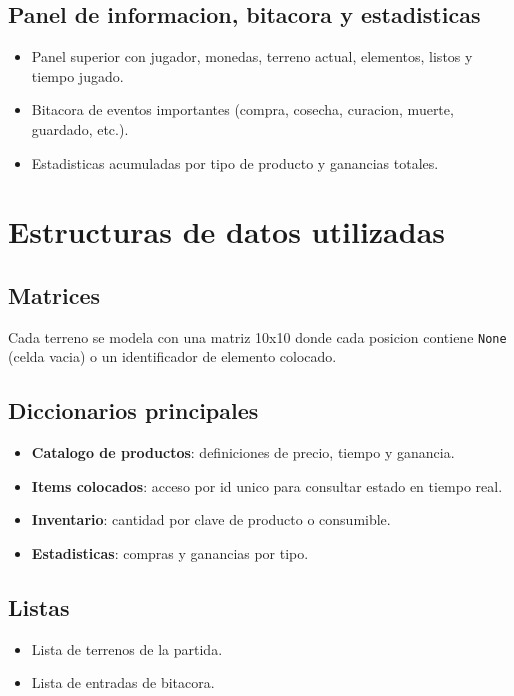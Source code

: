 \documentclass[12pt,a4paper]{article}
\begin{document}
\subsection{Panel de informacion, bitacora y estadisticas}
\begin{itemize}
    \item Panel superior con jugador, monedas, terreno actual, elementos, listos y tiempo jugado.
    \item Bitacora de eventos importantes (compra, cosecha, curacion, muerte, guardado, etc.).
    \item Estadisticas acumuladas por tipo de producto y ganancias totales.
\end{itemize}

\section{Estructuras de datos utilizadas}
\subsection{Matrices}
Cada terreno se modela con una matriz 10x10 donde cada posicion contiene \texttt{None} (celda vacia) o un identificador de elemento colocado.

\subsection{Diccionarios principales}
\begin{itemize}
    \item \textbf{Catalogo de productos}: definiciones de precio, tiempo y ganancia.
    \item \textbf{Items colocados}: acceso por id unico para consultar estado en tiempo real.
    \item \textbf{Inventario}: cantidad por clave de producto o consumible.
    \item \textbf{Estadisticas}: compras y ganancias por tipo.
\end{itemize}

\subsection{Listas}
\begin{itemize}
    \item Lista de terrenos de la partida.
    \item Lista de entradas de bitacora.
\end{itemize}
\end{document}
